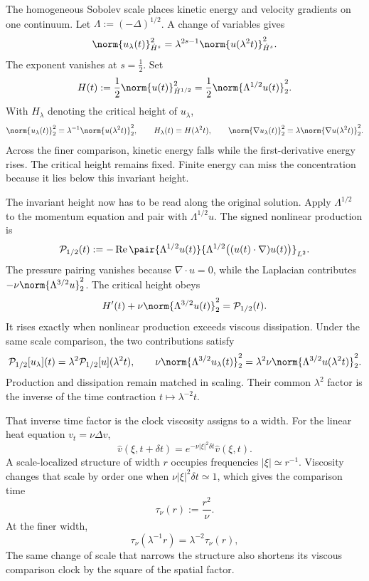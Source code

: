 
The homogeneous Sobolev scale places kinetic energy and velocity gradients on one continuum.
Let \(\Lambda:=(-\Delta)^{1/2}\).
A change of variables gives
\[
  \norm{u_\lambda(t)}_{\dot H^s}^2
  =
  \lambda^{2s-1}
  \norm{u(\lambda^2t)}_{\dot H^s}^2.
\]
The exponent vanishes at \(s=\tfrac12\).
Set
\[
  H(t)
  :=
  \frac12\norm{u(t)}_{\dot H^{1/2}}^2
  =
  \frac12\norm{\Lambda^{1/2}u(t)}_2^2.
\]
With \(H_\lambda\) denoting the critical height of \(u_\lambda\),
\[
  \norm{u_\lambda(t)}_2^2
  =
  \lambda^{-1}\norm{u(\lambda^2t)}_2^2,
  \qquad
  H_\lambda(t)=H(\lambda^2t),
  \qquad
  \norm{\nabla u_\lambda(t)}_2^2
  =
  \lambda\norm{\nabla u(\lambda^2t)}_2^2.
\]
Across the finer comparison, kinetic energy falls while the first-derivative energy rises.
The critical height remains fixed.
Finite energy can miss the concentration because it lies below this invariant height.


The invariant height now has to be read along the original solution.
Apply \(\Lambda^{1/2}\) to the momentum equation and pair with \(\Lambda^{1/2}u\).
The signed nonlinear production is
\[
  \mathcal P_{1/2}(t)
  :=
  -\operatorname{Re}
  \pair
    {\Lambda^{1/2}u(t)}
    {\Lambda^{1/2}\bigl((u(t)\cdot\nabla)u(t)\bigr)}_{L^2}.
\]
The pressure pairing vanishes because \(\nabla\cdot u=0\), while the Laplacian contributes \(-\nu\norm{\Lambda^{3/2}u}_2^2\).
The critical height obeys
\[
  H'(t)
  +
  \nu\norm{\Lambda^{3/2}u(t)}_2^2
  =
  \mathcal P_{1/2}(t).
\]
It rises exactly when nonlinear production exceeds viscous dissipation.
Under the same scale comparison, the two contributions satisfy
\[
  \mathcal P_{1/2}[u_\lambda](t)
  =
  \lambda^2\mathcal P_{1/2}[u](\lambda^2t),
  \qquad
  \nu\norm{\Lambda^{3/2}u_\lambda(t)}_2^2
  =
  \lambda^2\nu\norm{\Lambda^{3/2}u(\lambda^2t)}_2^2.
\]
Production and dissipation remain matched in scaling.
Their common \(\lambda^2\) factor is the inverse of the time contraction \(t\mapsto\lambda^{-2}t\).


That inverse time factor is the clock viscosity assigns to a width.
For the linear heat equation \(v_t=\nu\Delta v\),
\[
  \widehat v(\xi,t+\delta t)
  =
  e^{-\nu|\xi|^2\delta t}\widehat v(\xi,t).
\]
A scale-localized structure of width \(r\) occupies frequencies \(|\xi|\simeq r^{-1}\).
Viscosity changes that scale by order one when \(\nu|\xi|^2\delta t\simeq1\), which gives the comparison time
\[
  \tau_\nu(r)
  :=
  \frac{r^2}{\nu}.
\]
At the finer width,
\[
  \tau_\nu(\lambda^{-1}r)
  =
  \lambda^{-2}\tau_\nu(r),
\]
The same change of scale that narrows the structure also shortens its viscous comparison clock by the square of the spatial factor.

